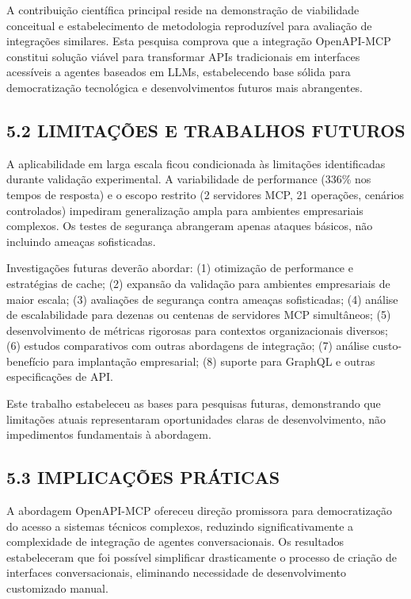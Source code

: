 \documentclass[
]{article}
\begin{document}
A contribuição científica principal reside na demonstração de
viabilidade conceitual e estabelecimento de metodologia reproduzível
para avaliação de integrações similares. Esta pesquisa comprova que a
integração OpenAPI-MCP constitui solução viável para transformar APIs
tradicionais em interfaces acessíveis a agentes baseados em LLMs,
estabelecendo base sólida para democratização tecnológica e
desenvolvimentos futuros mais abrangentes.

\subsection{5.2 LIMITAÇÕES E TRABALHOS
FUTUROS}\label{limitauxe7uxf5es-e-trabalhos-futuros}

A aplicabilidade em larga escala ficou condicionada às limitações
identificadas durante validação experimental. A variabilidade de
performance (336\% nos tempos de resposta) e o escopo restrito (2
servidores MCP, 21 operações, cenários controlados) impediram
generalização ampla para ambientes empresariais complexos. Os testes de
segurança abrangeram apenas ataques básicos, não incluindo ameaças
sofisticadas.

Investigações futuras deverão abordar: (1) otimização de performance e
estratégias de cache; (2) expansão da validação para ambientes
empresariais de maior escala; (3) avaliações de segurança contra ameaças
sofisticadas; (4) análise de escalabilidade para dezenas ou centenas de
servidores MCP simultâneos; (5) desenvolvimento de métricas rigorosas
para contextos organizacionais diversos; (6) estudos comparativos com
outras abordagens de integração; (7) análise custo-benefício para
implantação empresarial; (8) suporte para GraphQL e outras
especificações de API.

Este trabalho estabeleceu as bases para pesquisas futuras, demonstrando
que limitações atuais representaram oportunidades claras de
desenvolvimento, não impedimentos fundamentais à abordagem.

\subsection{5.3 IMPLICAÇÕES
PRÁTICAS}\label{implicauxe7uxf5es-pruxe1ticas}

A abordagem OpenAPI-MCP ofereceu direção promissora para democratização
do acesso a sistemas técnicos complexos, reduzindo significativamente a
complexidade de integração de agentes conversacionais. Os resultados
estabeleceram que foi possível simplificar drasticamente o processo de
criação de interfaces conversacionais, eliminando necessidade de
desenvolvimento customizado manual.
\end{document}

